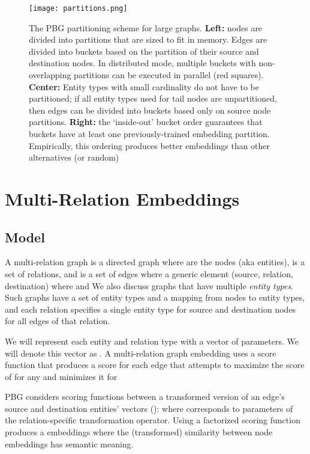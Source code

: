 \documentclass{article}
\begin{document}
\begin{figure*}[t]
\centering
\texttt{[image: partitions.png]}
\caption{The PBG partitioning scheme for large graphs. \textbf{Left:} nodes are divided into  partitions that are sized to fit in memory. Edges are divided into buckets based on the partition of their source and destination nodes. In distributed mode, multiple buckets with non-overlapping partitions can be executed in parallel (red squares). \textbf{Center:} Entity types with small cardinality do not have to be partitioned; if all entity types used for tail nodes are unpartitioned, then edges can be divided into  buckets based only on source node partitions. \textbf{Right:} the `inside-out' bucket order guarantees that buckets have at least one previously-trained embedding partition. Empirically, this ordering produces better embeddings than other alternatives (or random)}
\label{fig:partitions}
\end{figure*}

\section{Multi-Relation Embeddings}
\subsection{Model}
\label{section:model_description}

A multi-relation graph is a directed graph  where  are the nodes (aka entities),  is a set of relations, and  is a set of edges where a generic element  (source, relation, destination) where  and  We also discuss graphs that have multiple \textit{entity types}. Such graphs have a set of entity types and a mapping from nodes to entity types, and each relation specifies a single entity type for source and destination nodes for all edges of that relation.

We will represent each entity and relation type with a vector of parameters. We will denote this vector as . A multi-relation graph embedding uses a score function  that produces a score for each edge that attempts to maximize the score of  for any  and minimizes it for 

PBG considers scoring functions between a transformed version of an edge's source and destination entities' vectors ():  where  corresponds to parameters of the relation-specific transformation operator. Using a factorized scoring function produces a embeddings where the (transformed) similarity between node embeddings has semantic meaning.
\end{document}
